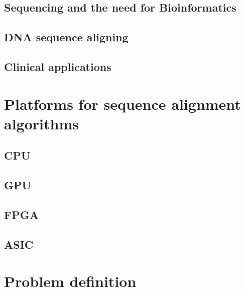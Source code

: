 \subsection{Sequencing and the need for Bioinformatics}
\subsection{DNA sequence aligning}
\subsection{Clinical applications}

\section{Platforms for sequence alignment algorithms}

\subsection{CPU}
\subsection{GPU}
\subsection{FPGA}
\subsection{ASIC}

\section{Problem definition}